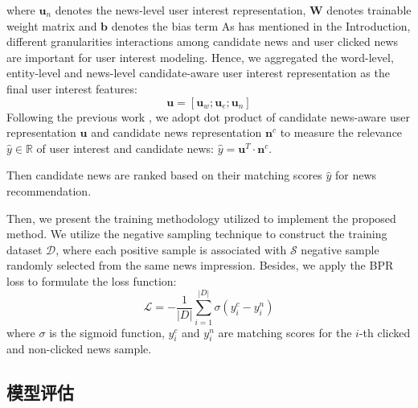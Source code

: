\documentclass[withoutpreface,bwprint]{cumcmthesis} %
\begin{document}
	where $\mathbf{u}_n$ denotes the news-level user interest representation,  $\mathbf{W}$ denotes trainable weight matrix and $\mathbf{b}$ denotes the bias term
	As has mentioned in the Introduction, different granularities interactions among candidate news and user clicked news are important for user interest modeling. Hence, we aggregated the word-level, entity-level and news-level candidate-aware user interest representation as the final user interest features:
	\begin{equation}
	\mathbf{u} = [\mathbf{u}_w; \mathbf{u}_e; \mathbf{u}_n]
	\end{equation}
	Following the previous work ,
	we adopt dot product of candidate news-aware user representation $\mathbf{u}$ and candidate news representation $\mathbf{n}^c$ to measure the relevance $\hat{y} \in \mathbb{R}$ of user interest and candidate news: $\hat{y} = \mathbf{u}^T \cdot \mathbf{n}^c$.

	Then candidate news are ranked based on their matching scores $\hat{y}$ for news recommendation.
	
	Then, we present the training methodology utilized to implement the proposed method. We utilize the negative sampling technique to construct the training dataset $\mathcal{D}$, where each positive sample is associated with $\mathcal{S}$ negative sample randomly selected from the same news impression. 
	Besides, we apply the BPR loss to formulate the loss function:
	\begin{equation}\label{eatt}
	\mathcal{L} =- \frac{1}{|D|}  {\textstyle \sum_{i=1}^{|D|}{\sigma (y_i^c-y_i^n)}}
	\end{equation}
	where $\sigma$ is the sigmoid function,
	$y_i^c$ and $y_i^n$ are matching scores for the $i$-th clicked and non-clicked news sample.
	\newpage
	\subsection{模型评估}
\end{document}
